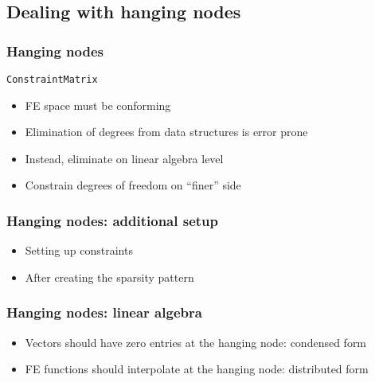 \subsection{Dealing with hanging nodes}
\begin{frame}
  \frametitle{Hanging nodes}
  \begin{block}{\lstinline!ConstraintMatrix!}
    \begin{itemize}
    \item FE space must be conforming
    \item Elimination of degrees from data structures is error prone
    \item Instead, eliminate on linear algebra level
    \item Constrain degrees of freedom on ``finer'' side
    \end{itemize}
  \end{block}
\end{frame}

\begin{frame}
  \frametitle{Hanging nodes: additional setup}
  \begin{itemize}
  \item Setting up constraints
    \begin{block}{}
      
    \end{block}
  \item After creating the sparsity pattern
    \begin{block}{}
      
    \end{block}
  \end{itemize}
\end{frame}

\begin{frame}
  \frametitle{Hanging nodes: linear algebra}
  \begin{itemize}
  \item Vectors should have zero entries at the hanging node:
    condensed form
    \begin{block}{}
      
    \end{block}
  \item FE functions should interpolate at the hanging node:
    distributed form
    \begin{block}{}
      
    \end{block}
  \end{itemize}
\end{frame}

